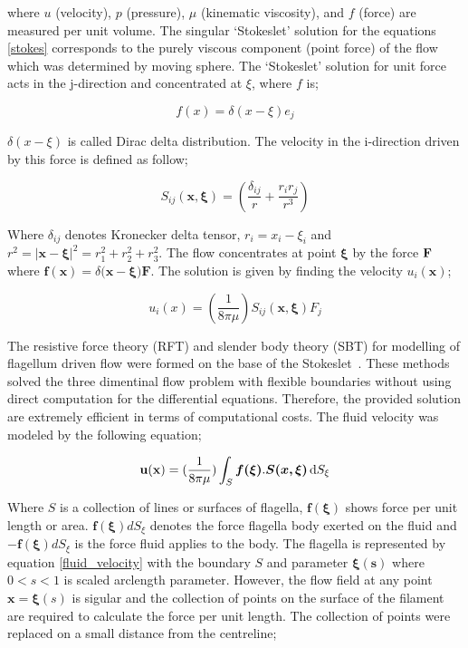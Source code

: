 \documentclass[12pt,a4paper,titlepage]{report}
\begin{document}
where $u$ (velocity), $p$ (pressure), $\mu $ (kinematic viscosity), and $f$ (force) are measured per unit
volume. The singular \lq{}Stokeslet\rq{} solution for the equations \ref{stokes} corresponds to the purely 
viscous component (point force) of the flow which was determined by moving sphere. 
The \lq{}Stokeslet\rq{} solution for unit force acts in the j-direction and concentrated at $\xi $, where $f$ is;
  

\begin{equation}
 f (x) = \delta (x - \xi) e_j 
\label{force}
\end{equation}

$\delta (x - \xi)$ is called Dirac delta distribution. The velocity in the i-direction driven by this force is defined
 as follow;


\begin{equation}
 S _{ij} \bm{(x , \xi)} = (\frac{\delta _{ij}}{r} + \frac{r_i r_j}{r^3})
\label{i-direction}
\end{equation}

Where $\delta _{ij}$ denotes Kronecker delta tensor, $r_i = x_i - \xi _i$ and $r^2 =| \bm{x}- \bm{\xi} |^2 = r_1 ^2 + r_2 ^ 2 + r_3 ^2$.
The flow concentrates at point $\bm \xi$ by the force $\bold F$ where $ \bm{f (x)} = \delta (\bm{x} - \bm{\xi) F}$.
The solution is given by finding the velocity $u_i(\bm x)$;

\begin{equation}
 u_i(x) =(\frac{1}{8 \pi \mu}) S_{ij}\bm{( x, \xi)} F_j
\label{velocity}
\end{equation}

The resistive force theory (RFT) and slender body theory (SBT) for modelling of flagellum driven 
flow were formed on the base of the Stokeslet~\citep{smith2009boundary}. These methods solved the 
three dimentinal flow problem with flexible boundaries without using direct computation for the differential
equations. Therefore, the provided solution are extremely efficient in terms of computational costs. The fluid
velocity was modeled by the following equation;
   


\begin{equation}
\bold {u(x)} =(\frac{1}{8 \pi \mu}) \int_S \mathrm \bm{f(\xi)} . \bm{S( x, \xi)}\, \mathrm{d}S_{\xi}
\label{fluid_velocity}
\end{equation}

Where $S$ is a collection of lines or surfaces of flagella, $\bm{f(\xi)}$ shows force per unit length or area.
$\bm{f(\xi)} dS_{\xi}$ denotes the force flagella body exerted on the fluid and $-\bm{f(\xi)} dS_{\xi}$ is the 
force fluid applies to the body. The flagella is represented by equation \ref{fluid_velocity} with the boundary
$S$ and parameter $\bm{\xi (s)}$ where $0 < s <1$ is scaled arclength parameter. However, the flow field
at any point $\bm{x} = \bm{\xi} (s)$ is sigular and the collection of points on the surface of the filament 
are required to calculate the force per unit length. The collection of points were replaced on a small distance 
from the centreline;
\end{document}
